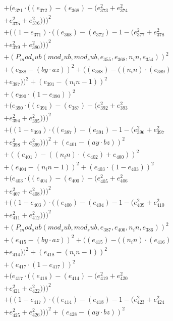 \documentclass[10pt, a4paper]{article}
\begin{document}
\begin{small}
\begin{align*}
& + (e_{371}  \cdot  ((e_{372}) - (e_{368}) - (e_{373}^{2} + e_{374}^{2} \\
& + e_{375}^{2} + e_{376}^{2})))^{2} \\
& + ((1 - e_{371})  \cdot  ((e_{368}) - (e_{372}) - 1 - (e_{377}^{2} + e_{378}^{2} \\
& + e_{379}^{2} + e_{380}^{2})))^{2} \\
& + (P_mod_sub(mod_sub, mod_sub, e_{355}, e_{368}, n_in, e_{354}))^{2} \\
& + (e_{388} - (by  \cdot  az))^{2} + ((e_{388}) - ((n_in)  \cdot  (e_{389}) \\
& + e_{387}))^{2} + (e_{391} - (n_in - 1))^{2} \\
& + (e_{390}  \cdot  (1 - e_{390}))^{2} \\
& + (e_{390}  \cdot  ((e_{391}) - (e_{387}) - (e_{392}^{2} + e_{393}^{2} \\
& + e_{394}^{2} + e_{395}^{2})))^{2} \\
& + ((1 - e_{390})  \cdot  ((e_{387}) - (e_{391}) - 1 - (e_{396}^{2} + e_{397}^{2} \\
& + e_{398}^{2} + e_{399}^{2})))^{2} + (e_{401} - (ay  \cdot  bz))^{2} \\
& + ((e_{401}) - ((n_in)  \cdot  (e_{402}) + e_{400}))^{2} \\
& + (e_{404} - (n_in - 1))^{2} + (e_{403}  \cdot  (1 - e_{403}))^{2} \\
& + (e_{403}  \cdot  ((e_{404}) - (e_{400}) - (e_{405}^{2} + e_{406}^{2} \\
& + e_{407}^{2} + e_{408}^{2})))^{2} \\
& + ((1 - e_{403})  \cdot  ((e_{400}) - (e_{404}) - 1 - (e_{409}^{2} + e_{410}^{2} \\
& + e_{411}^{2} + e_{412}^{2})))^{2} \\
& + (P_mod_sub(mod_sub, mod_sub, e_{387}, e_{400}, n_in, e_{386}))^{2} \\
& + (e_{415} - (by  \cdot  az))^{2} + ((e_{415}) - ((n_in)  \cdot  (e_{416}) \\
& + e_{414}))^{2} + (e_{418} - (n_in - 1))^{2} \\
& + (e_{417}  \cdot  (1 - e_{417}))^{2} \\
& + (e_{417}  \cdot  ((e_{418}) - (e_{414}) - (e_{419}^{2} + e_{420}^{2} \\
& + e_{421}^{2} + e_{422}^{2})))^{2} \\
& + ((1 - e_{417})  \cdot  ((e_{414}) - (e_{418}) - 1 - (e_{423}^{2} + e_{424}^{2} \\
& + e_{425}^{2} + e_{426}^{2})))^{2} + (e_{428} - (ay  \cdot  bz))^{2} \\

\end{align*}
\end{small}
\end{document}
